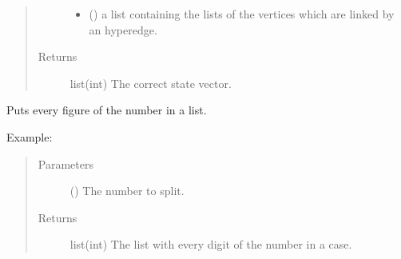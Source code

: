 \documentclass[letterpaper,10pt,english]{sphinxmanual}
\begin{document}
\begin{fulllineitems}
\begin{quote}
\begin{description}
\begin{itemize}
\item {} 
 (\sphinxstyleliteralemphasis{\sphinxupquote{{[}}}\sphinxstyleliteralemphasis{\sphinxupquote{{[}}}\sphinxstyleliteralemphasis{\sphinxupquote{{]}}}) \textendash{} a list containing the lists of the 
vertices which are linked by an hyperedge.

\end{itemize}

\item[{Returns}] \leavevmode
list(int) \textendash{} The correct state vector.

\end{description}\end{quote}

\end{fulllineitems}


\begin{fulllineitems}
\label{\detokenize{hypergraphstates-opti:mermin_on_qiskit.hypergraphstates_optimization.hypergraphstates.putting_in_list}}
Puts every figure of the number in a list.
\begin{description}
\item[{Example:}] \leavevmode
\begin{sphinxVerbatim}[commandchars=\\\{\}]
\end{sphinxVerbatim}

\end{description}
\begin{quote}\begin{description}
\item[{Parameters}] \leavevmode
{} () \textendash{} The number to split.

\item[{Returns}] \leavevmode
list(int) \textendash{} The list with every digit of the number in a case.

\end{description}\end{quote}

\end{fulllineitems}
\end{document}
